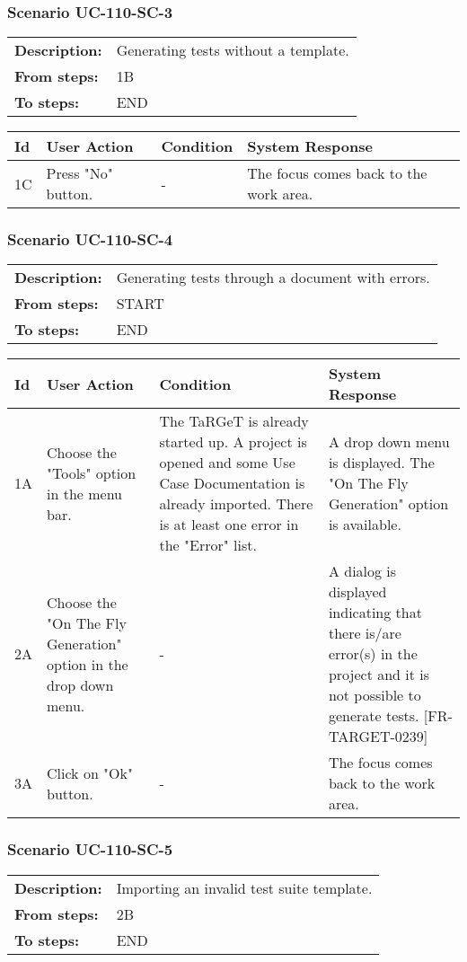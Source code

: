 \documentclass[a4paper,11pt]{article}
\newcommand{\bl}{\\ \hline}
\begin{document}
\subsubsection*{Scenario UC-110-SC-3}
\begin{tabular}{p{1in}p{4in}}
{\bf Description:} & Generating tests without a template. \\
{\bf From steps:} & 1B \\
{\bf To steps:} & END \\
\end{tabular}
 
\begin{tabular}{|p{0.8in}|p{1.6in}|p{1.6in}|p{1.6in}|}
\hline
Id & User Action & Condition & System Response  \bl 
1C & Press "No" button. & - & The focus comes back to the work area. \bl 
\end{tabular}
\subsubsection*{Scenario UC-110-SC-4}
\begin{tabular}{p{1in}p{4in}}
{\bf Description:} & Generating tests through a document with errors. \\
{\bf From steps:} & START \\
{\bf To steps:} & END \\
\end{tabular}
 
\begin{tabular}{|p{0.8in}|p{1.6in}|p{1.6in}|p{1.6in}|}
\hline
Id & User Action & Condition & System Response  \bl 
1A & Choose the "Tools" option in the menu bar. & The TaRGeT is already started up. A project is opened and some Use Case Documentation is already imported. There is at least one error in the "Error" list. & A drop down menu is displayed. The "On The Fly Generation" option is available. \bl 
2A & Choose the "On The Fly Generation" option in the drop down menu. & - & A dialog is displayed indicating that there is/are error(s) in the project and it is not possible to generate tests. [FR-TARGET-0239] \bl 
3A & Click on "Ok" button. & - & The focus comes back to the work area. \bl 
\end{tabular}
\subsubsection*{Scenario UC-110-SC-5}
\begin{tabular}{p{1in}p{4in}}
{\bf Description:} & Importing an invalid test suite template. \\
{\bf From steps:} & 2B \\
{\bf To steps:} & END \\
\end{tabular}
 
\end{document}
